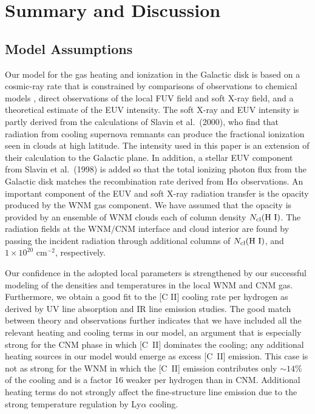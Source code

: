 \documentclass[12pt,preprint,flushrt]{aastex}
\begin{document}
\section{Summary and Discussion}
\label{sec:disc}

\subsection{Model Assumptions}

Our model for the gas heating and ionization in the Galactic disk
is based on a cosmic-ray rate that is constrained by comparisons of
observations to  chemical models
\cite[e.g.,][]{dish86,fed96,tak00}, direct observations of the local
FUV field and soft X-ray field,  and
a theoretical estimate of the EUV intensity.
The soft X-ray and EUV intensity is partly derived from the calculations of
Slavin et al.\ (2000),
who find that radiation from cooling supernova remnants can
produce the fractional ionization seen in clouds at high latitude.
The intensity used in this paper is an extension of their calculation to
the Galactic plane.  In addition,
a stellar EUV component from Slavin et al.\ (1998) is added so that the total
ionizing photon flux from the Galactic disk matches the recombination
rate derived from H$\alpha$ observations. An important component of the EUV
and soft X-ray radiation transfer is the opacity produced by the
WNM gas component.
We have assumed that the opacity is provided by an ensemble of WNM clouds
each of column density $N_{\rm cl}({\rm H~I})$.  The radiation
fields at the WNM/CNM interface and cloud interior
are found by passing the incident radiation through
additional columns of 
$N_{\rm cl}({\rm H~I})$, and $1\times 10^{20}$ cm$^{-2}$,
respectively.

Our confidence in the adopted local parameters is strengthened
by our successful modeling of the densities and temperatures in the
local WNM and CNM gas. Furthermore, we obtain a good fit to the
[C II] cooling rate per hydrogen as derived by UV line absorption and IR
line emission studies.
The good match between theory and observations further indicates that we
have included all the relevant
heating and cooling terms in our model, an argument that is especially
strong for the CNM phase in which [C~II] dominates the cooling; any additional
heating sources in our model would emerge as excess [C~II] emission.
This case is not as strong for the WNM in which the [C~II] emission
contributes only  $\sim 14$\% of the cooling and
is a factor 16 weaker per hydrogen than in CNM.
Additional heating terms do not strongly affect
the fine-structure
line emission due to the strong temperature regulation by Ly$\alpha$
cooling.
\end{document}
